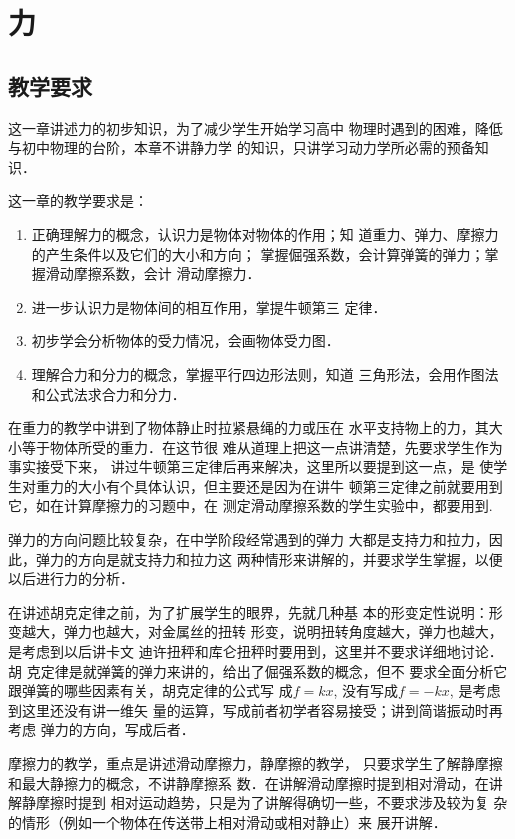\chapter{力}\minitoc[n]
\section{教学要求}
这一章讲述力的初步知识，为了减少学生开始学习高中
物理时遇到的困难，降低与初中物理的台阶，本章不讲静力学
的知识，只讲学习动力学所必需的预备知识．


这一章的教学要求是：

\begin{enumerate}
\item 正确理解力的概念，认识力是物体对物体的作用；知
道重力、弹力、摩擦力的产生条件以及它们的大小和方向；
掌握倔强系数，会计算弹簧的弹力；掌握滑动摩擦系数，会计
滑动摩擦力．
\item 进一步认识力是物体间的相互作用，掌提牛顿第三
定律．
\item 
初步学会分析物体的受力情况，会画物体受力图．
\item 理解合力和分力的概念，掌握平行四边形法则，知道
三角形法，会用作图法和公式法求合力和分力．
\end{enumerate}

在重力的教学中讲到了物体静止时拉紧悬绳的力或压在
水平支持物上的力，其大小等于物体所受的重力．在这节很
难从道理上把这一点讲清楚，先要求学生作为事实接受下来，
讲过牛顿第三定律后再来解决，这里所以要提到这一点，是
使学生对重力的大小有个具体认识，但主要还是因为在讲牛
顿第三定律之前就要用到它，如在计算摩擦力的习题中，在
测定滑动摩擦系数的学生实验中，都要用到.

弹力的方向问题比较复杂，在中学阶段经常遇到的弹力
大都是支持力和拉力，因此，弹力的方向是就支持力和拉力这
两种情形来讲解的，并要求学生掌握，以便以后进行力的分析．

在讲述胡克定律之前，为了扩展学生的眼界，先就几种基
本的形变定性说明：形变越大，弹力也越大，对金属丝的扭转
形变，说明扭转角度越大，弹力也越大，是考虑到以后讲卡文
迪许扭秤和库仑扭秤时要用到，这里并不要求详细地讨论．胡
克定律是就弹簧的弹力来讲的，给出了倔强系数的概念，但不
要求全面分析它跟弹簧的哪些因素有关，胡克定律的公式写
成$f=kx$, 没有写成$f=-kx$, 是考虑到这里还没有讲一维矢
量的运算，写成前者初学者容易接受；讲到简谐振动时再考虑
弹力的方向，写成后者．

摩擦力的教学，重点是讲述滑动摩擦力，静摩擦的教学，
只要求学生了解静摩擦和最大静擦力的概念，不讲静摩擦系
数．在讲解滑动摩擦时提到相对滑动，在讲解静摩擦时提到
相对运动趋势，只是为了讲解得确切一些，不要求涉及较为复
杂的情形（例如一个物体在传送带上相对滑动或相对静止）来
展开讲解．

